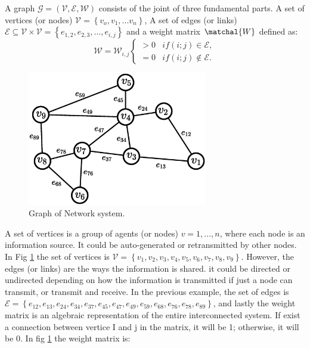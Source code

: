 A graph $\mathcal{G} = (\mathcal{V,E,W})$ consists of the joint of three fundamental parts. A set of vertices (or nodes) $\mathcal{V} = \left\{ v_o,v_1, ... v_n \right\}$, A set of edges (or links) $\mathcal{E} \subseteq  \mathcal{V} \times  \mathcal{V} =  \left \{ e_{1,2},e_{2,3},...,e_{i,j} \right \}$ and a weight matrix $\matchal{W}$ defined as:\\

\begin{equation}
\mathcal{W}  = \mathcal{W}_{i,j} \left\{ \begin{array}{cl}
> 0 & if (i;j) \in \mathcal{E}, \\
=0 & if (i;j) \notin  \mathcal{E}.
\end{array} \right.
\end{equation}


\begin{figure}[h]
\begin{center}
    \includegraphics[width=0.7\textwidth]{Kap2/Graph-01.eps}
    \caption{ Graph of Network system.}
    \label{fig:Graph}
\end{center}
\end{figure}


A set of vertices is a group of agents (or nodes) $v = 1,..., n$, where each node is an information source. It could be auto-generated or retransmitted by other nodes. In Fig \ref{fig:Graph} the set of vertices is $\mathcal{V} = \left\{ v_1,v_2,v_3,v_4,v_5,v_6,v_7,v_8,v_9 \right\}$.
However, the edges (or links) are the ways the information is shared. it could be directed or undirected depending on how the information is transmitted if just a node can transmit, or transmit and receive. In the previous example, the set of edges is $ \mathcal{E} = \left\{ e_{12},e_{13},e_{24},e_{34},e_{37},e_{45},e_{47},e_{49},e_{59},e_{68},e_{76},e_{78},e_{89} \right\}$, and lastly the weight matrix is an algebraic representation of the entire interconnected system. If exist a connection between vertice I and j in the matrix, it will be 1; otherwise, it will be 0. In fig \ref{fig:Graph} the weight matrix is:


